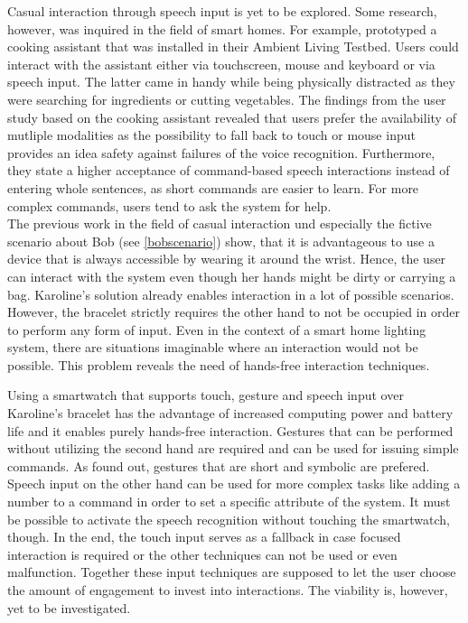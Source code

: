 Casual interaction through speech input is yet to be explored. Some research, however, was inquired in the field of smart homes. For example, \cite{blumendorf2008multimodal} prototyped a cooking assistant that was installed in their Ambient Living Testbed. Users could interact with the assistant either via touchscreen, mouse and keyboard or via speech input. The latter came in handy while being physically distracted as they were searching for ingredients or cutting vegetables. The findings from the user study based on the cooking assistant revealed that users prefer the availability of mutliple modalities as the possibility to fall back to touch or mouse input provides an idea safety against failures of the voice recognition. Furthermore, they state a higher acceptance of command-based speech interactions instead of entering whole sentences, as short commands are easier to learn. For more complex commands, users tend to ask the system for help.\\

The previous work in the field of casual interaction und especially the fictive scenario about Bob (see \ref{bobscenario}) show, that it is advantageous to use a device that is always accessible by wearing it around the wrist. Hence, the user can interact with the system even though her hands might be dirty or carrying a bag. Karoline's solution \cite{Busse2014Thesis} already enables interaction in a lot of possible scenarios. However, the bracelet strictly requires the other hand to not be occupied in order to perform any form of input. Even in the context of a smart home lighting system, there are situations imaginable where an interaction would not be possible. This problem reveals the need of hands-free interaction techniques. 

Using a smartwatch that supports touch, gesture and speech input over Karoline's bracelet \cite{Busse2014Thesis} has the advantage of increased computing power and battery life and it enables purely hands-free interaction. Gestures that can be performed without utilizing the second hand are required and can be used for issuing simple commands. As \cite{kuhnel2011m} found out, gestures that are short and symbolic are prefered. Speech input on the other hand can be used for more complex tasks like adding a number to a command in order to set a specific attribute of the system. It must be possible to activate the speech recognition without touching the smartwatch, though. In the end, the touch input serves as a fallback in case focused interaction is required or the other techniques can not be used or even malfunction. Together these input techniques are supposed to let the user choose the amount of engagement to invest into interactions. The viability is, however, yet to be investigated.







